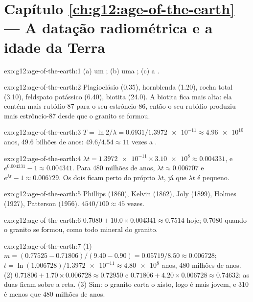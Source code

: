 \section*{Capítulo \ref{ch:g12:age-of-the-earth} --- A datação radiométrica e a idade da Terra}

\begin{solution}{exo:g12:age-of-the-earth:1}
(a) um ; (b) uma ; (c) a .
\end{solution}

\begin{solution}{exo:g12:age-of-the-earth:2}
Plagioclásio (0.35), hornblenda (1.20), rocha total (3.10), feldspato
potássico (6.40), biotita (24.0). A biotita fica mais alta: ela contém mais
rubídio-87 para o seu estrôncio-86, então o seu rubídio produziu mais
estrôncio-87 desde que o granito se formou.
\end{solution}

\begin{solution}{exo:g12:age-of-the-earth:3}
$T = \ln 2/\lambda = 0.6931/\num{1.3972e-11} \approx \num{4.96e10}$ anos,
49.6 bilhões de anos: $49.6/4.54 \approx 11$ vezes a .
\end{solution}

\begin{solution}{exo:g12:age-of-the-earth:4}
$\lambda t = \num{1.3972e-11} \times \num{3.10e8} \approx 0.004331$, e
$e^{0.004331} - 1 \approx 0.004341$. Para 480 milhões de anos, $\lambda t
\approx 0.006707$ e $e^{\lambda t} - 1 \approx 0.006729$. Os dois ficam perto
do próprio $\lambda t$, já que $\lambda t$ é pequeno.
\end{solution}

\begin{solution}{exo:g12:age-of-the-earth:5}
Phillips (1860), Kelvin (1862), Joly (1899), Holmes (1927), Patterson
(1956). $4540/100 \approx 45$ vezes.
\end{solution}

\begin{solution}{exo:g12:age-of-the-earth:6}
$0.7080 + 10.0 \times 0.004341 \approx 0.7514$ hoje; 0.7080 quando o granito
se formou, como todo mineral do granito.
\end{solution}

\begin{solution}{exo:g12:age-of-the-earth:7}
(1) $m = (0.77525 - 0.71806)/(9.40 - 0.90) = 0.05719/8.50 \approx 0.006728$;
$t = \ln(1.006728)/\num{1.3972e-11} \approx \num{4.80e8}$ anos, 480 milhões
de anos. (2) $0.71806 + 1.70 \times 0.006728 \approx 0.72950$ e $0.71806 + 4.20
\times 0.006728 \approx 0.74632$: as duas ficam sobre a reta. (3) Sim: o
granito corta o xisto, logo é mais jovem, e 310 é menos que 480 milhões de anos.
\end{solution}

